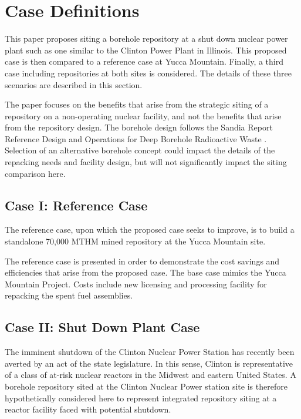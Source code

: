 
\section{Case Definitions}

This paper proposes siting a borehole
 repository at a shut down nuclear power plant such as one similar to the 
 Clinton Power Plant in Illinois. This proposed case is then compared to a 
 reference case at Yucca Mountain. Finally, a third case including repositories 
 at both sites is considered.  The details of these three scenarios are described in this section.

The paper focuses on the benefits that arise from the strategic siting of a repository 
on a non-operating nuclear facility, and not the benefits that arise from the repository design. 
The borehole design follows the Sandia Report Reference Design and Operations 
for Deep Borehole Radioactive Waste \cite{arnold_reference_2011}. Selection of 
an alternative borehole concept could impact the details of the repacking needs 
and facility design, but will not significantly impact the siting comparison 
here.
 
\subsection{Case I: Reference Case} 
The reference case, upon which the proposed case seeks to improve, is to build 
a standalone 70,000 \gls{MTHM} mined repository at the Yucca Mountain site.

The reference case is presented in order to demonstrate the cost savings and efficiencies 
that arise from the proposed case. The base case mimics the Yucca Mountain Project.
Costs include new licensing and processing facility for repacking the spent fuel assemblies.

\subsection{Case II: Shut Down Plant Case}

The imminent shutdown of the Clinton Nuclear Power Station has recently been 
averted by an act of the state legislature. In this sense, Clinton is 
representative of a class of at-risk nuclear 
reactors in the Midwest and eastern United States. A borehole repository 
sited at the Clinton Nuclear Power station site is therefore hypothetically 
considered here to represent integrated repository siting at a reactor facility 
faced with potential shutdown.


